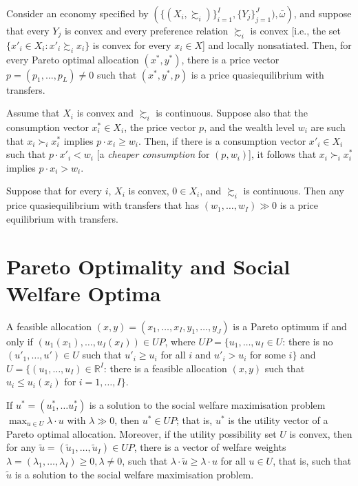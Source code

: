\begin{prop}
    Consider an economy specified by $\left(\{(X_i, \succsim_i)\}_{i = 1}^I, \{Y_j\}_{j = 1}^J), \bar{\omega}\right)$, and suppose that every $Y_j$ is convex and every preference relation $\succsim_i$ is convex [i.e., the set $\{x'_i \in X_i : x'_i \succsim_i x_i\}$ is convex for every $x_i \in X$] and locally nonsatiated. Then, for every Pareto optimal allocation $(x^*, y^*)$, there is a price vector $p = (p_1, \dots, p_L) \neq 0$ such that $(x^*, y^*, p)$ is a price quasiequilibrium with transfers.
\end{prop}

\begin{prop}
    Assume that $X_i$ is convex and $\succsim_i$ is continuous. Suppose also that the consumption vector $x^*_i \in X_i$, the price vector $p$, and the wealth level $w_i$ are such that $x_i \succ_i x^*_i$ implies $p \cdot x_i \geq w_i$. Then, if there is a consumption vector $x'_i \in X_i$ such that $p \cdot x'_i < w_i$ [a \emph{cheaper consumption} for $(p, w_i)$], it follows that $x_i \succ_i x^*_i$ implies $p \cdot x_i > w_i$.
\end{prop}

\begin{prop}
    Suppose that for every $i$, $X_i$ is convex, $0 \in X_i$, and $\succsim_i$ is continuous. Then any price quasiequilibrium with transfers that has $(w_1, \dots, w_I) \gg 0$ is a price equilibrium with transfers.
\end{prop}


\section{Pareto Optimality and Social Welfare Optima}

\begin{prop}
    A feasible allocation $(x, y) = (x_1, \dots, x_I, y_1, \dots, y_J)$ is a Pareto optimum if and only if $\left(u_1(x_1), \dots, u_I(x_I) \right) \in UP$, where
    $UP = \{u_1, \dots, u_I \in U$: there is no $(u'_1, \dots, u') \in U$ such that $u'_i \geq u_i$ for all $i$ and $u'_i > u_i$ for some $i \}$ and $U = \{(u_1, \dots, u_I) \in \mathbb{R}^I$: there is a feasible allocation $(x, y)$ such that $u_i \leq u_i(x_i)$ for $i = 1, \dots, I\}$.
\end{prop}

\begin{prop}
    If $u^* = (u^*_1, \dots u^*_I)$ is a solution to the social welfare maximisation problem $\max_{u \in U} \lambda \cdot u$ with $\lambda \gg 0$, then $u^* \in UP$; that is, $u^*$ is the utility vector of a Pareto optimal allocation. Moreover, if the utility possibility set $U$ is convex, then for any $\tilde{u} = (\tilde{u}_1, \dots, \tilde{u}_I) \in UP$, there is a vector of welfare weights $\lambda = (\lambda_1, \dots, \lambda_I) \geq 0, \lambda \neq 0$, such that $\lambda \cdot \tilde{u} \geq \lambda \cdot u$ for all $u \in U$, that is, such that $\tilde{u}$ is a solution to the social welfare maximisation problem.
\end{prop}


